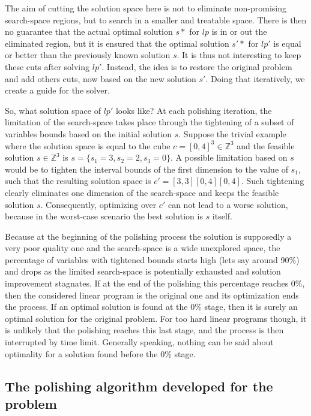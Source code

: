 The aim of cutting the solution space here is not to eliminate non-promising search-space regions, but to search in a smaller and treatable space. There is then no guarantee that the actual optimal solution $s*$ for $lp$ is in or out the eliminated region, but it is ensured that the optimal solution $s'*$ for $lp'$ is equal or better than the previously known solution $s$. It is thus not interesting to keep these cuts after solving $lp'$. Instead, the idea is to restore the original problem and add others cuts, now based on the new solution $s'$. Doing that iteratively, we create a guide for the solver.

So, what solution space of $lp'$ looks like? At each polishing iteration, the limitation of the search-space takes place through the tightening of a subset of variables bounds based on the initial solution $s$. Suppose the trivial example where the solution space is equal to the cube $c = [0, 4]^3 \in \mathbb{Z}^3$ and the feasible solution $s \in \mathbb{Z}^3$ is $s = \{s_1=3,s_2=2,s_3=0\}$. A possible limitation based on $s$ would be to tighten the interval bounds of the first dimension to the value of $s_1$, such that the resulting solution space is $c' = [3, 3][0, 4][0, 4]$. Such tightening clearly eliminates one dimension of the search-space and keeps the feasible solution $s$. Consequently, optimizing over $c'$ can not lead to a worse solution, because in the worst-case scenario the best solution is $s$ itself.

Because at the beginning of the polishing process the solution is supposedly a very poor quality one and the search-space is a wide unexplored space, the percentage of variables with tightened bounds starts high (lets say around 90\%) and drops as the limited search-space is potentially exhausted and solution improvement stagnates. If at the end of the polishing this percentage reaches 0\%, then the considered linear program is the original one and its optimization ends the process. If an optimal solution is found at the 0\% stage, then it is surely an optimal solution for the original problem. For too hard linear programs though, it is unlikely that the polishing reaches this last stage, and the process is then interrupted by time limit. Generally speaking, nothing can be said about optimality for a solution found before the 0\% stage.



\subsection{The polishing algorithm developed for the problem}

